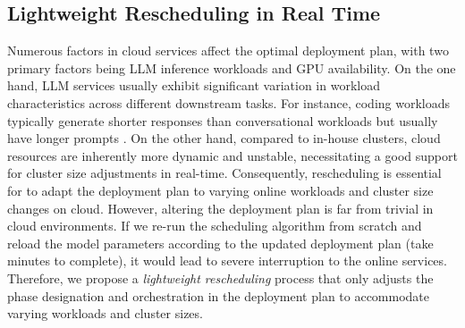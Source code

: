 \subsection{Lightweight Rescheduling in Real Time}
\label{sec:method_light_reschedule}
Numerous factors in cloud services affect the optimal deployment plan, with two primary factors being LLM inference workloads and GPU availability. On the one hand, LLM services usually exhibit significant variation in workload characteristics across different downstream tasks. For instance, coding workloads typically generate shorter responses than conversational workloads but usually have longer prompts \cite{patel2023splitwise}. 
On the other hand, compared to in-house clusters, cloud resources are inherently more dynamic and unstable, necessitating a good support for cluster size adjustments in real-time. 
Consequently, rescheduling is essential for \sys to adapt the deployment plan to varying online workloads and cluster size changes on cloud.
However, altering the deployment plan is far from trivial in cloud environments. If we re-run the scheduling algorithm from scratch and reload the model parameters according to the updated deployment plan (take minutes to complete), it would lead to severe interruption to the online services. 
Therefore, 
we propose a \textit{lightweight rescheduling} process that only adjusts the phase designation and orchestration in the deployment plan to accommodate varying workloads and cluster sizes.

